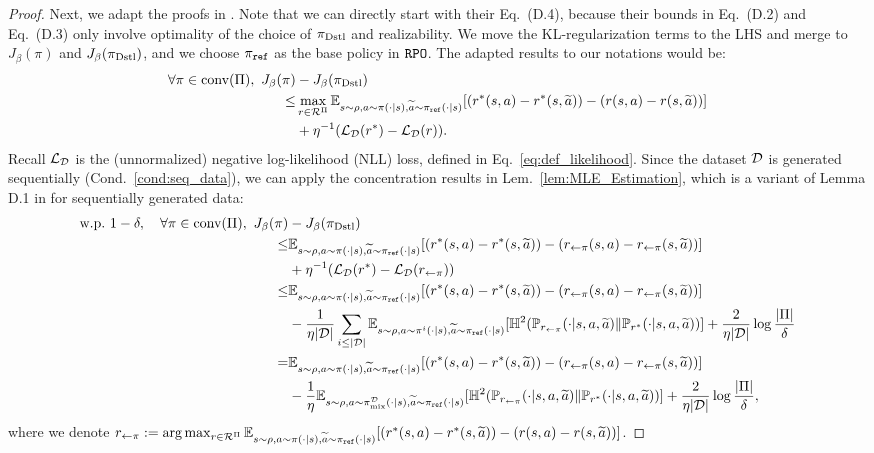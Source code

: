 \begin{proof}
    Next, we adapt the proofs in \citep{liu2024provably}. Note that we can directly start with their Eq.~(D.4), because their bounds in Eq.~(D.2) and Eq.~(D.3) only involve optimality of the choice of $\pi_{\text{Dstl}}$ and realizability.
    We move the KL-regularization terms to the LHS and merge to $J_\beta(\pi)$ and $J_\beta(\pi_{\text{Dstl}})$, and we choose $\pi_{\texttt{ref}}$ as the base policy in ${\texttt{RPO}}$. The adapted results to our notations would be:
    \begin{align*}
        \forall \pi \in \text{conv}(\Pi),~ J_\beta(\pi) & - J_\beta(\pi_{\text{Dstl}}) \\
        \leq & \max_{r\in\mathcal{R}^{\Pi}} \mathbb{E}_{s\sim\rho,a\sim\pi(\cdot|s),\widetilde{a}\sim\pi_{\texttt{ref}}(\cdot|s)}[(r^*(s,a) - r^*(s,\widetilde{a})) - (r(s,a) - r(s,\widetilde{a}))] \\
        & + \eta^{-1} (\mathcal{L}_{\mathcal{D}}(r^*) - \mathcal{L}_{\mathcal{D}}(r)).
    \end{align*}
    Recall $\mathcal{L}_{\mathcal{D}}$ is the (unnormalized) negative log-likelihood (NLL) loss, defined in Eq.~\eqref{eq:def_likelihood}.
    Since the dataset $\mathcal{D}$ is generated sequentially (Cond.~\ref{cond:seq_data}), we can apply the concentration results in Lem.~\ref{lem:MLE_Estimation}, which is a variant of Lemma D.1 in \citep{liu2024provably} for sequentially generated data:
    \begin{align*}
        \text{w.p.}~1-\delta,\quad \forall \pi\in \text{conv}(\Pi),~ J_\beta(\pi) & - J_\beta(\pi_{\text{Dstl}}) \\
        \leq & \mathbb{E}_{s\sim\rho,a\sim\pi(\cdot|s),\widetilde{a}\sim\pi_{\texttt{ref}}(\cdot|s)}[(r^*(s,a) - r^*(s,\widetilde{a})) - (r_{\gets\pi}(s,a) - r_{\gets\pi}(s,\widetilde{a}))] \\
        & + \eta^{-1} (\mathcal{L}_{\mathcal{D}}(r^*) - \mathcal{L}_{\mathcal{D}}(r_{\gets\pi})) \\
        \leq &  \mathbb{E}_{s\sim\rho,a\sim\pi(\cdot|s),\widetilde{a}\sim\pi_{\texttt{ref}}(\cdot|s)}[(r^*(s,a) - r^*(s,\widetilde{a})) - (r_{\gets\pi}(s,a) - r_{\gets\pi}(s,\widetilde{a}))] \\
        & - \frac{1}{\eta|\mathcal{D}|}\sum_{i \leq |\mathcal{D}|} \mathbb{E}_{s\sim\rho,a\sim\pi^i(\cdot|s),\widetilde{a}\sim\pi_{\texttt{ref}}(\cdot|s)}[\mathbb{H}^2({\mathbb{P}}_{r_{\gets\pi}}(\cdot|s,a,\widetilde{a})\| {\mathbb{P}}_{r^*}(\cdot|s,a,\widetilde{a}))] + \frac{2}{\eta|\mathcal{D}|}\log\frac{|\Pi|}{\delta}\\
        = &  \mathbb{E}_{s\sim\rho,a\sim\pi(\cdot|s),\widetilde{a}\sim\pi_{\texttt{ref}}(\cdot|s)}[(r^*(s,a) - r^*(s,\widetilde{a})) - (r_{\gets\pi}(s,a) - r_{\gets\pi}(s,\widetilde{a}))] \\
        & - \frac{1}{\eta} \mathbb{E}_{s\sim\rho,a\sim\pi^{\mathcal{D}}_{\text{mix}}(\cdot|s),\widetilde{a}\sim\pi_{\texttt{ref}}(\cdot|s)}[\mathbb{H}^2({\mathbb{P}}_{r_{\gets\pi}}(\cdot|s,a,\widetilde{a})\| {\mathbb{P}}_{r^*}(\cdot|s,a,\widetilde{a}))] + \frac{2}{\eta|\mathcal{D}|}\log\frac{|\Pi|}{\delta},
    \end{align*}
    where we denote $r_{\gets\pi} := \arg\max_{r\in\mathcal{R}^{\Pi}} \mathbb{E}_{s\sim\rho,a\sim\pi(\cdot|s),\widetilde{a}\sim\pi_{\texttt{ref}}(\cdot|s)}[(r^*(s,a) - r^*(s,\widetilde{a})) - (r(s,a) - r(s,\widetilde{a}))]$.


\end{proof}
